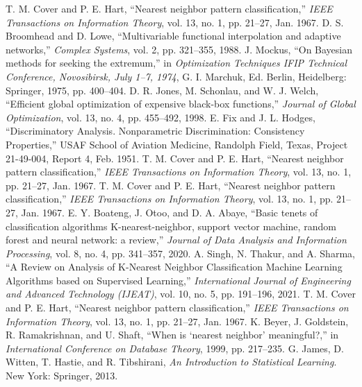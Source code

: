 \documentclass[conference]{IEEEtran}
\begin{document}
\begin{thebibliography}{99}
 T. M. Cover and P. E. Hart, “Nearest neighbor pattern classification,” \textit{IEEE Transactions on Information Theory}, vol. 13, no. 1, pp. 21–27, Jan. 1967.
 D. S. Broomhead and D. Lowe, “Multivariable functional interpolation and adaptive networks,” \textit{Complex Systems}, vol. 2, pp. 321–355, 1988.
 J. Mockus, “On Bayesian methods for seeking the extremum,” in \textit{Optimization Techniques IFIP Technical Conference, Novosibirsk, July 1–7, 1974}, G. I. Marchuk, Ed. Berlin, Heidelberg: Springer, 1975, pp. 400–404.
 D. R. Jones, M. Schonlau, and W. J. Welch, “Efficient global optimization of expensive black-box functions,” \textit{Journal of Global Optimization}, vol. 13, no. 4, pp. 455–492, 1998.
 E. Fix and J. L. Hodges, “Discriminatory Analysis. Nonparametric Discrimination: Consistency Properties,” USAF School of Aviation Medicine, Randolph Field, Texas, Project 21-49-004, Report 4, Feb. 1951.
 T. M. Cover and P. E. Hart, “Nearest neighbor pattern classification,” \textit{IEEE Transactions on Information Theory}, vol. 13, no. 1, pp. 21–27, Jan. 1967.
 T. M. Cover and P. E. Hart, “Nearest neighbor pattern classification,” \textit{IEEE Transactions on Information Theory}, vol. 13, no. 1, pp. 21–27, Jan. 1967.
 E. Y. Boateng, J. Otoo, and D. A. Abaye, “Basic tenets of classification algorithms K-nearest-neighbor, support vector machine, random forest and neural network: a review,” \textit{Journal of Data Analysis and Information Processing}, vol. 8, no. 4, pp. 341–357, 2020.
 A. Singh, N. Thakur, and A. Sharma, “A Review on Analysis of K-Nearest Neighbor Classification Machine Learning Algorithms based on Supervised Learning,” \textit{International Journal of Engineering and Advanced Technology (IJEAT)}, vol. 10, no. 5, pp. 191–196, 2021.
 T. M. Cover and P. E. Hart, “Nearest neighbor pattern classification,” \textit{IEEE Transactions on Information Theory}, vol. 13, no. 1, pp. 21–27, Jan. 1967.
 K. Beyer, J. Goldstein, R. Ramakrishnan, and U. Shaft, “When is ‘nearest neighbor’ meaningful?,” in \textit{International Conference on Database Theory}, 1999, pp. 217–235.
 G. James, D. Witten, T. Hastie, and R. Tibshirani, \textit{An Introduction to Statistical Learning}. New York: Springer, 2013.

\end{thebibliography}
\end{document}
